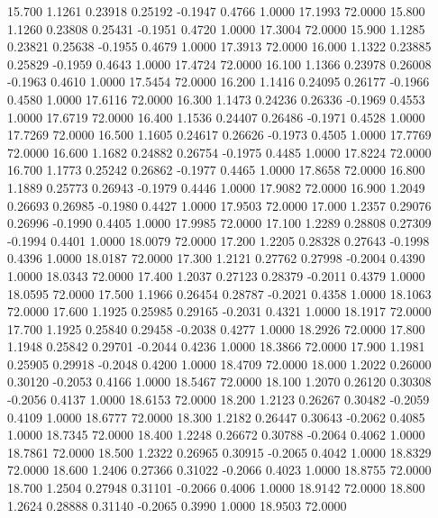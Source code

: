   15.700   1.1261   0.23918   0.25192  -0.1947   0.4766   1.0000  17.1993  72.0000
  15.800   1.1260   0.23808   0.25431  -0.1951   0.4720   1.0000  17.3004  72.0000
  15.900   1.1285   0.23821   0.25638  -0.1955   0.4679   1.0000  17.3913  72.0000
  16.000   1.1322   0.23885   0.25829  -0.1959   0.4643   1.0000  17.4724  72.0000
  16.100   1.1366   0.23978   0.26008  -0.1963   0.4610   1.0000  17.5454  72.0000
  16.200   1.1416   0.24095   0.26177  -0.1966   0.4580   1.0000  17.6116  72.0000
  16.300   1.1473   0.24236   0.26336  -0.1969   0.4553   1.0000  17.6719  72.0000
  16.400   1.1536   0.24407   0.26486  -0.1971   0.4528   1.0000  17.7269  72.0000
  16.500   1.1605   0.24617   0.26626  -0.1973   0.4505   1.0000  17.7769  72.0000
  16.600   1.1682   0.24882   0.26754  -0.1975   0.4485   1.0000  17.8224  72.0000
  16.700   1.1773   0.25242   0.26862  -0.1977   0.4465   1.0000  17.8658  72.0000
  16.800   1.1889   0.25773   0.26943  -0.1979   0.4446   1.0000  17.9082  72.0000
  16.900   1.2049   0.26693   0.26985  -0.1980   0.4427   1.0000  17.9503  72.0000
  17.000   1.2357   0.29076   0.26996  -0.1990   0.4405   1.0000  17.9985  72.0000
  17.100   1.2289   0.28808   0.27309  -0.1994   0.4401   1.0000  18.0079  72.0000
  17.200   1.2205   0.28328   0.27643  -0.1998   0.4396   1.0000  18.0187  72.0000
  17.300   1.2121   0.27762   0.27998  -0.2004   0.4390   1.0000  18.0343  72.0000
  17.400   1.2037   0.27123   0.28379  -0.2011   0.4379   1.0000  18.0595  72.0000
  17.500   1.1966   0.26454   0.28787  -0.2021   0.4358   1.0000  18.1063  72.0000
  17.600   1.1925   0.25985   0.29165  -0.2031   0.4321   1.0000  18.1917  72.0000
  17.700   1.1925   0.25840   0.29458  -0.2038   0.4277   1.0000  18.2926  72.0000
  17.800   1.1948   0.25842   0.29701  -0.2044   0.4236   1.0000  18.3866  72.0000
  17.900   1.1981   0.25905   0.29918  -0.2048   0.4200   1.0000  18.4709  72.0000
  18.000   1.2022   0.26000   0.30120  -0.2053   0.4166   1.0000  18.5467  72.0000
  18.100   1.2070   0.26120   0.30308  -0.2056   0.4137   1.0000  18.6153  72.0000
  18.200   1.2123   0.26267   0.30482  -0.2059   0.4109   1.0000  18.6777  72.0000
  18.300   1.2182   0.26447   0.30643  -0.2062   0.4085   1.0000  18.7345  72.0000
  18.400   1.2248   0.26672   0.30788  -0.2064   0.4062   1.0000  18.7861  72.0000
  18.500   1.2322   0.26965   0.30915  -0.2065   0.4042   1.0000  18.8329  72.0000
  18.600   1.2406   0.27366   0.31022  -0.2066   0.4023   1.0000  18.8755  72.0000
  18.700   1.2504   0.27948   0.31101  -0.2066   0.4006   1.0000  18.9142  72.0000
  18.800   1.2624   0.28888   0.31140  -0.2065   0.3990   1.0000  18.9503  72.0000
